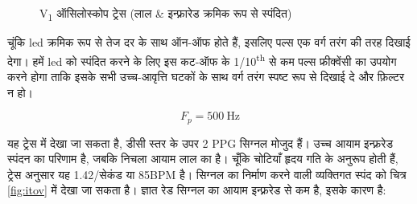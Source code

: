 			\begin{figure}[ht!]
				\centering
				\hfill
				\caption{V\textsubscript{1} ऑसिलोस्कोप ट्रेस (लाल \& इन्फ़्रारेड क्रमिक रूप से स्पंदित) }
			\end{figure}
			
			चूंकि led क्रमिक रूप से तेज दर के साथ ऑन-ऑफ होते हैं, इसलिए पल्स एक वर्ग तरंग की तरह दिखाई देगा। हमें led को स्पंदित करने के लिए इस कट-ऑफ के 1/10\textsuperscript{th} से कम पल्स फ्रीक्वेंसी का उपयोग करने होगा ताकि इसके सभी उच्च-आवृत्ति घटकों के साथ वर्ग तरंग स्पष्ट रूप से दिखाई दे और फ़िल्टर न हो।
			
			\[	
			F_p = \SI{500}{\hertz}
			\]
					
			
			यह ट्रेस में देखा जा सकता है, डीसी स्तर के उपर 2 PPG सिग्नल मोजुद हैं।
			उच्च आयाम इन्फ़्ररेड स्पंदन का परिणाम है, जबकि निचला आयाम लाल का है। चूँकि चोटियाँ हृदय गति के अनुरूप होती हैं, ट्रेस अनुसार यह 1.42/सेकंड या 85BPM है। सिग्नल का निर्माण करने वाली व्यक्तिगत स्पंद को चित्र \ref{fig:itov} में देखा जा सकता है। ज्ञात रेड सिग्नल का आयाम इन्फ़्ररेड से कम है, इसके कारण है:
			
